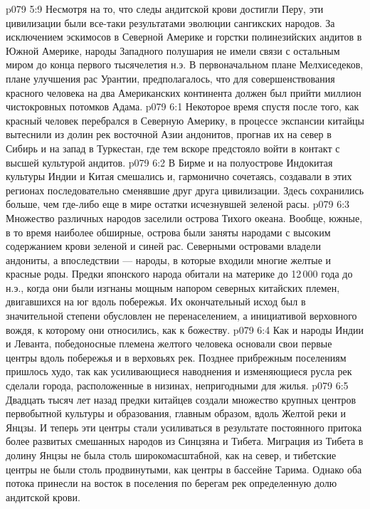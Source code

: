 \vs p079 5:9 Несмотря на то, что следы андитской крови достигли Перу, эти цивилизации были все\hyp{}таки результатами эволюции сангикских народов. За исключением эскимосов в Северной Америке и горстки полинезийских андитов в Южной Америке, народы Западного полушария не имели связи с остальным миром до конца первого тысячелетия н.э. В первоначальном плане Мелхиседеков, плане улучшения рас Урантии, предполагалось, что для совершенствования красного человека на два Американских континента должен был прийти миллион чистокровных потомков Адама.
\vs p079 6:1 Некоторое время спустя после того, как красный человек перебрался в Северную Америку, в процессе экспансии китайцы вытеснили из долин рек восточной Азии андонитов, прогнав их на север в Сибирь и на запад в Туркестан, где тем вскоре предстояло войти в контакт с высшей культурой андитов.
\vs p079 6:2 В Бирме и на полуострове Индокитая культуры Индии и Китая смешались и, гармонично сочетаясь, создавали в этих регионах последовательно сменявшие друг друга цивилизации. Здесь сохранились больше, чем где\hyp{}либо еще в мире остатки исчезнувшей зеленой расы.
\vs p079 6:3 Множество различных народов заселили острова Тихого океана. Вообще, южные, в то время наиболее обширные, острова были заняты народами с высоким содержанием крови зеленой и синей рас. Северными островами владели андониты, а впоследствии --- народы, в которые входили многие желтые и красные роды. Предки японского народа обитали на материке до 12\,000 года до н.э., когда они были изгнаны мощным напором северных китайских племен, двигавшихся на юг вдоль побережья. Их окончательный исход был в значительной степени обусловлен не перенаселением, а инициативой верховного вождя, к которому они относились, как к божеству.
\vs p079 6:4 Как и народы Индии и Леванта, победоносные племена желтого человека основали свои первые центры вдоль побережья и в верховьях рек. Позднее прибрежным поселениям пришлось худо, так как усиливающиеся наводнения и изменяющиеся русла рек сделали города, расположенные в низинах, непригодными для жилья.
\vs p079 6:5 Двадцать тысяч лет назад предки китайцев создали множество крупных центров первобытной культуры и образования, главным образом, вдоль Желтой реки и Янцзы. И теперь эти центры стали усиливаться в результате постоянного притока более развитых смешанных народов из Синцзяна и Тибета. Миграция из Тибета в долину Янцзы не была столь широкомасштабной, как на север, и тибетские центры не были столь продвинутыми, как центры в бассейне Тарима. Однако оба потока принесли на восток в поселения по берегам рек определенную долю андитской крови.
